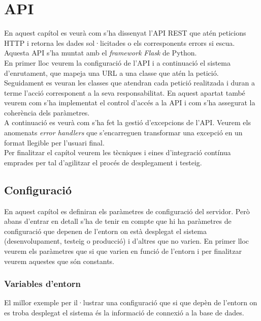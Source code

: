 \section{\ac{API}} \label{sec_api2}

En aquest capítol es veurà com s'ha dissenyat l'\ac{API} \ac{REST} que atén peticions \ac{HTTP} i retorna les dades sol·licitades o els corresponents errors si escua. Aquesta \ac{API} s'ha muntat amb el \emph{framework} \emph{Flask} de Python. \\

En primer lloc veurem la configuració de l'\ac{API} i a continuació el sistema d'enrutament, que mapeja una \ac{URL} a una classe que atén la petició.\\

Seguidament es veuran les classes que atendran cada petició realitzada i duran a terme l'acció corresponent a la seva responsabilitat. En aquest apartat també veurem com s'ha implementat el control d'accés a la \ac{API} i com s'ha assegurat la coherència dels paràmetres.\\

A continuació es veurà com s'ha fet la gestió d'excepcions de l'\ac{API}. Veurem els anomenats \emph{error handlers} que s'encarreguen transformar una excepció en un format llegible per l'usuari final.\\

Per finalitzar el capítol veurem les tècniques i eines d'integració contínua emprades per tal d'agilitzar el procés de desplegament i testeig.

\subsection{Configuració}

En aquest capítol es definiran els paràmetres de configuració del servidor. Però abans d'entrar en detall s'ha de tenir en compte que hi ha paràmetres de configuració que depenen de l'entorn on està desplegat el sistema (desenvolupament, testeig o producció) i d'altres que no varien. En primer lloc veurem els paràmetres que si que varien en funció de l'entorn i per finalitzar veurem aquestes que són constants.

\subsubsection{Variables d'entorn} \label{configuracion_entorn}

El millor exemple per il·lustrar una configuració que si que depèn de l'entorn on es troba desplegat el sistema és la informació de connexió a la base de dades.\\

